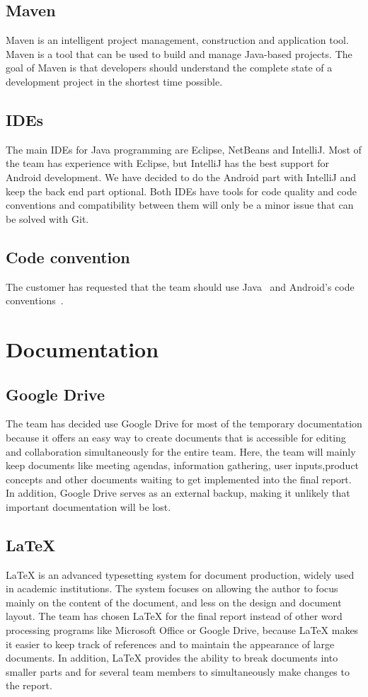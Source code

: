 \subsection{Maven}
Maven is an intelligent project management, construction and application tool. Maven is a tool that can be used to build and manage Java-based projects. The goal of Maven is that developers should understand the complete state of a development project in the shortest time possible.

\subsection{IDEs}
The main IDEs for Java programming are Eclipse, NetBeans and IntelliJ. Most of the team has experience with Eclipse, but IntelliJ has the best support for Android development.
We have decided to do the Android part with IntelliJ and keep the back end part optional. Both IDEs have tools for code quality and code conventions and compatibility between them will only be a minor issue that can be solved with Git.

\subsection{Code convention}
The customer has requested that the team should use Java~\cite{javaconv} and Android's code conventions~\cite{androidconv}.

\section{Documentation}

\subsection{Google Drive}
The team has decided use Google Drive for most of the temporary documentation because it offers an easy way to create 
documents that is accessible for editing and collaboration simultaneously for the entire team. Here, the team will mainly 
keep documents like meeting agendas, information gathering, user inputs,product concepts and other documents 
waiting to get implemented into the final report. 
In addition, Google Drive serves as an external backup, making it unlikely that important documentation will be lost. 


\subsection{\LaTeX}
LaTeX is an advanced typesetting system for document production, widely used in
academic institutions. The system focuses on allowing the author to focus mainly on the content of the document, 
and less on the design and document layout.
The team has chosen LaTeX for the final report instead of other word processing programs like Microsoft Office or 
Google Drive, because LaTeX makes it easier to keep track of references and to maintain the appearance of large
documents. In addition, LaTeX provides the ability to break documents into smaller parts and for several team 
members to simultaneously make changes to the report.


